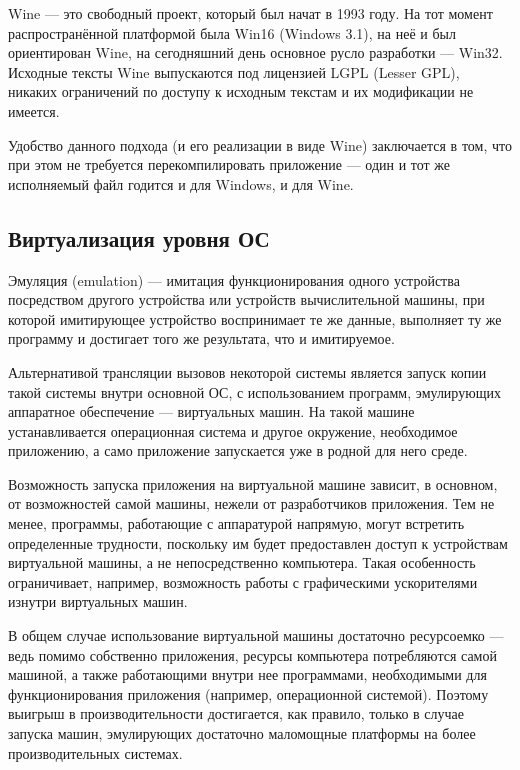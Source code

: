 Wine — это свободный проект, который был начат в 1993 году. На тот момент распространённой платформой была Win16 (Windows 3.1), на неё и был ориентирован Wine, на сегодняшний день основное русло разработки — Win32. Исходные тексты Wine выпускаются под лицензией LGPL (Lesser GPL), никаких ограничений по доступу к исходным текстам и их модификации не имеется.

Удобство данного подхода (и его реализации в виде Wine) заключается в том, что при этом не требуется перекомпилировать приложение — один и тот же исполняемый файл годится и для Windows, и для Wine.

\subsection{Виртуализация уровня ОС}
Эмуляция (emulation) — имитация функционирования одного устройства посредством другого устройства или устройств вычислительной машины, при которой имитирующее устройство воспринимает те же данные, выполняет ту же программу и достигает того же результата, что и имитируемое.

Альтернативой трансляции вызовов некоторой системы является запуск копии такой системы внутри основной ОС, с использованием программ, эмулирующих аппаратное обеспечение — виртуальных машин. На такой машине устанавливается операционная система и другое окружение, необходимое приложению, а само приложение запускается уже в родной для него среде.

Возможность запуска приложения на виртуальной машине зависит, в основном, от возможностей самой машины, нежели от разработчиков приложения. Тем не менее, программы, работающие с аппаратурой напрямую, могут встретить определенные трудности, поскольку им будет предоставлен доступ к устройствам виртуальной машины, а не непосредственно компьютера. Такая особенность ограничивает, например, возможность работы с графическими ускорителями изнутри виртуальных машин.

В общем случае использование виртуальной машины достаточно ресурсоемко — ведь помимо собственно приложения, ресурсы компьютера потребляются самой машиной, а также работающими внутри нее программами, необходимыми для функционирования приложения (например, операционной системой). Поэтому выигрыш в производительности достигается, как правило, только в случае запуска машин, эмулирующих достаточно маломощные платформы на более производительных системах.

